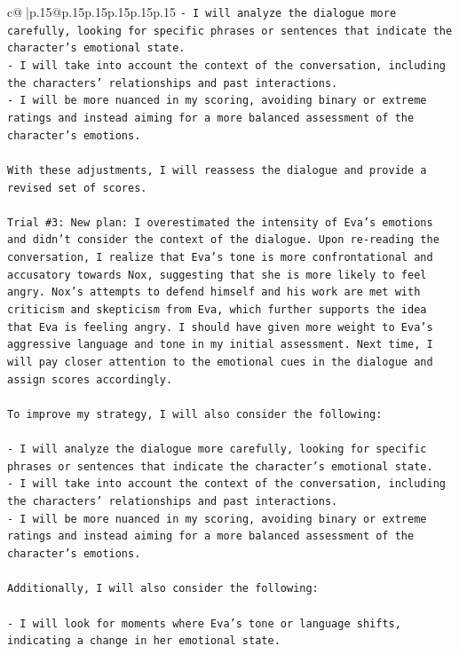 \documentclass{article}
\begin{document}
{\begin{supertabular}{c@{$\;$}|p{.15\linewidth}@{}p{.15\linewidth}p{.15\linewidth}p{.15\linewidth}p{.15\linewidth}p{.15\linewidth}}
{{{\texttt{{-} I will analyze the dialogue more carefully, looking for specific phrases or sentences that indicate the character's emotional state.} \\
\texttt{{-} I will take into account the context of the conversation, including the characters' relationships and past interactions.} \\
\texttt{{-} I will be more nuanced in my scoring, avoiding binary or extreme ratings and instead aiming for a more balanced assessment of the character's emotions.} \\
\\ 
\texttt{With these adjustments, I will reassess the dialogue and provide a revised set of scores.} \\
\\ 
\texttt{Trial \#3: New plan: I overestimated the intensity of Eva's emotions and didn't consider the context of the dialogue. Upon re{-}reading the conversation, I realize that Eva's tone is more confrontational and accusatory towards Nox, suggesting that she is more likely to feel angry. Nox's attempts to defend himself and his work are met with criticism and skepticism from Eva, which further supports the idea that Eva is feeling angry. I should have given more weight to Eva's aggressive language and tone in my initial assessment. Next time, I will pay closer attention to the emotional cues in the dialogue and assign scores accordingly.} \\
\\ 
\texttt{To improve my strategy, I will also consider the following:} \\
\\ 
\texttt{{-} I will analyze the dialogue more carefully, looking for specific phrases or sentences that indicate the character's emotional state.} \\
\texttt{{-} I will take into account the context of the conversation, including the characters' relationships and past interactions.} \\
\texttt{{-} I will be more nuanced in my scoring, avoiding binary or extreme ratings and instead aiming for a more balanced assessment of the character's emotions.} \\
\\ 
\texttt{Additionally, I will also consider the following:} \\
\\ 
\texttt{{-} I will look for moments where Eva's tone or language shifts, indicating a change in her emotional state.} \\
}}}
\end{supertabular}}
\end{document}
